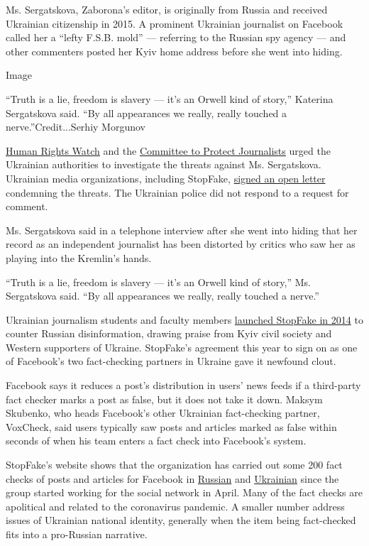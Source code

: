 Ms. Sergatskova, Zaborona's editor, is originally from Russia and
received Ukrainian citizenship in 2015. A prominent Ukrainian journalist
on Facebook called her a ``lefty F.S.B. mold'' --- referring to the
Russian spy agency --- and other commenters posted her Kyiv home address
before she went into hiding.

Image

``Truth is a lie, freedom is slavery --- it's an Orwell kind of story,''
Katerina Sergatskova said. ``By all appearances we really, really
touched a nerve.''Credit...Serhiy Morgunov

\href{https://www.hrw.org/news/2020/07/14/ukraine-independent-journalist-threatened\#}{Human
Rights Watch} and the
\href{https://cpj.org/2020/07/ukrainian-journalist-katerina-sergatskova-in-hiding-amid-threats-doxing/}{Committee
to Protect Journalists} urged the Ukrainian authorities to investigate
the threats against Ms. Sergatskova. Ukrainian media organizations,
including StopFake,
\href{https://detector.media/community/article/178813/2020-07-15-gromadski-organizatsii-vimagayut-zakhistiti-katerinu-sergatskovu/}{signed
an open letter} condemning the threats. The Ukrainian police did not
respond to a request for comment.

Ms. Sergatskova said in a telephone interview after she went into hiding
that her record as an independent journalist has been distorted by
critics who saw her as playing into the Kremlin's hands.

``Truth is a lie, freedom is slavery --- it's an Orwell kind of story,''
Ms. Sergatskova said. ``By all appearances we really, really touched a
nerve.''

Ukrainian journalism students and faculty members
\href{https://www.nytimes3xbfgragh.onion/2017/02/26/world/europe/ukraine-kiev-fake-news.html}{launched
StopFake in 2014} to counter Russian disinformation, drawing praise from
Kyiv civil society and Western supporters of Ukraine. StopFake's
agreement this year to sign on as one of Facebook's two fact-checking
partners in Ukraine gave it newfound clout.

Facebook says it reduces a post's distribution in users' news feeds if a
third-party fact checker marks a post as false, but it does not take it
down. Maksym Skubenko, who heads Facebook's other Ukrainian
fact-checking partner, VoxCheck, said users typically saw posts and
articles marked as false within seconds of when his team enters a fact
check into Facebook's system.

StopFake's website shows that the organization has carried out some 200
fact checks of posts and articles for Facebook in
\href{https://www.stopfake.org/ru/category/factcheck_for_facebook_ru/}{Russian}
and
\href{https://www.stopfake.org/uk/category/factcheck_facebook_ua/}{Ukrainian}
since the group started working for the social network in April. Many of
the fact checks are apolitical and related to the coronavirus pandemic.
A smaller number address issues of Ukrainian national identity,
generally when the item being fact-checked fits into a pro-Russian
narrative.

